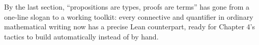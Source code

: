 By the last section, ``propositions are types, proofs are terms'' has gone from a one-line slogan to a working toolkit: every connective and quantifier in ordinary mathematical writing now has a precise Lean counterpart, ready for Chapter 4's tactics to build automatically instead of by hand.










